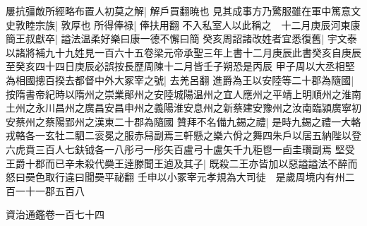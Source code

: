屢抗彊敵所經略布置人初莫之解|{
	解戶買翻暁也}
見其成事方乃驚服雖在軍中篤意文史敦睦宗族|{
	敦厚也}
所得俸禄|{
	俸扶用翻}
不入私室人以此稱之　十二月庚辰河東康簡王叔獻卒|{
	謚法温柔好樂曰康一德不懈曰簡}
癸亥周詔諸改姓者宜悉復舊|{
	宇文泰以諸將補九十九姓見一百六十五卷梁元帝承聖三年上書十二月庚辰此書癸亥自庚辰至癸亥四十四日庚辰必誤按長歷周陳十二月皆壬子朔恐是丙辰}
甲子周以大丞相堅為相國摠百揆去都督中外大冢宰之號|{
	去羌呂翻}
進爵為王以安陸等二十郡為隨國|{
	按隋書帝紀時以隋州之崇業鄖州之安陸城陽温州之宜人應州之平靖上明順州之淮南土州之永川昌州之廣昌安昌申州之義陽淮安息州之新蔡建安豫州之汝南臨潁廣寧初安蔡州之蔡陽郢州之漢東二十郡為隨國}
贊拜不名備九錫之禮|{
	是時九錫之禮一大輅戎輅各一玄牡二駟二衮冕之服赤舄副焉三軒懸之樂六佾之舞四朱戶以居五納陛以登六虎賁三百人七鈇钺各一八彤弓一彤矢百盧弓十盧矢千九秬鬯一卣圭瓚副焉}
堅受王爵十郡而已辛未殺代奰王逹滕聞王逌及其子|{
	既殺二王亦皆加以惡謚謚法不醉而怒曰奰色取行違曰聞奰平祕翻}
壬申以小冢宰元孝規為大司徒　是歲周境内有州二百一十一郡五百八

資治通鑑卷一百七十四

